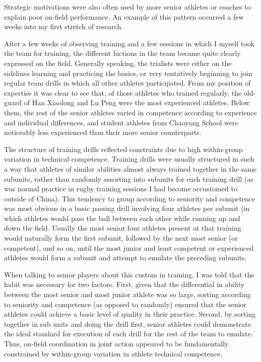 \begin{CJK}{UTF8}{gbsn}
Strategic motivations were also often used by more senior athletes or coaches to explain poor on-field performance.  An example of this pattern occurred a few weeks into my first stretch of research.

After a few weeks of observing training and a few sessions in which I myself took the team for training, the different factions in the team became quite clearly expressed on the field.  Generally speaking, the trialists were either on the sidelines learning and practicing the basics, or very tentatively beginning to join regular team drills in which all other athletes participated.  From my position of expertise it was clear to see that, of those athletes who trained regularly, the old-guard of Han Xiaolong and Lu Peng were the most experienced athletes.  Below them, the rest of the senior athletes varied in competence according to experience and individual differences, and student athletes from Chaoyang School were noticeably less experienced than their more senior counterparts.

The structure of training drills reflected constraints due to high within-group variation in technical competence.  Training drills were usually structured in such a way that athletes of similar abilities almost always trained together in the same subunits, rather than randomly assorting into subunits for each training drill (as was normal practice in rugby training sessions I had become accustomed to outside of China).  This tendency to group according to seniority and competence was most obvious in a basic passing drill involving four athletes per subunit (in which athletes would pass the ball between each other while running up and down the field.  Usually the most senior four athletes present at that training would naturally form the first subunit, followed by the next most senior (or competent), and so on, until the most junior and least competent or experienced athletes would form a subunit and attempt to emulate the preceding subunits.

When talking to senior players about this custom in training, I was told that the habit was necessary for two factors.  First, given that the differential in ability between the most senior and most junior athlete was so large, sorting according to seniority and competence (as opposed to randomly) ensured that the senior athletes could achieve a basic level of quality in their practice.  Second, by sorting together in sub units and doing the drill first, senior athletes could demonstrate the ideal standard for execution of each drill for the rest of the team to emulate.  Thus, on-field coordination in joint action appeared to be fundamentally constrained by within-group variation in athlete technical competence.


\end{CJK}
